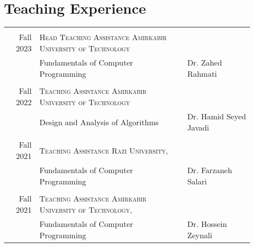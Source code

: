 


\section{Teaching Experience}

\begin{tabular}{r|l l}	

\multicolumn{2}{c}{} \\	%

Fall 2023 							& \textsc{Head Teaching Assistance Amirkabir University of Technology} \hfill 
\\
                                    & Fundamentals of Computer Programming & Dr. Zahed Rahmati
\\                               
\\

Fall 2022 							& \textsc{Teaching Assistance Amirkabir University of Technology}
\\
                                    & Design and Analysis of Algorithms & Dr. Hamid Seyed Javadi 
\\                               
\\

Fall 2021							& \textsc{Teaching Assistance Razi University},  
\\
                                    & Fundamentals of Computer Programming & Dr. Farzaneh Salari
\\
\\
Fall 2021 							& \textsc{Teaching Assistance Amirkabir University of Technology},
\\
                                    & Fundamentals of Computer Programming & Dr. Hossein Zeynali 

\end{tabular}